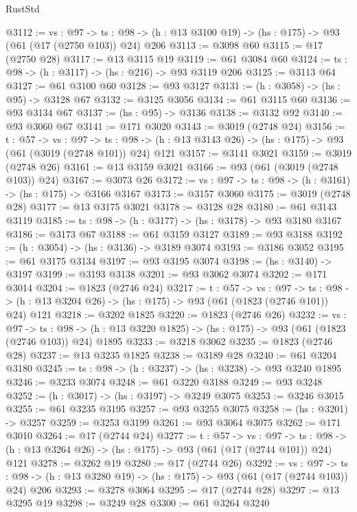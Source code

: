 \begin{lexlean}{RustStd}
\begin{coremodule}
@3112 := {vs : @97} ->
  {ts : @98} -> (h : @13 @3100 @19) -> (hs : @175) -> @93 (@61 (@17 (@2750 @103)) @24) @206
@3113 := @3098 @60
@3115 := @17 (@2750 @28)
@3117 := @13 @3115 @19
@3119 := @61 @3084 @60
@3124 := {ts : @98} -> (h : @3117) -> (hs : @216) -> @93 @3119 @206
@3125 := @3113 @64
@3127 := @61 @3100 @60
@3128 := @93 @3127
@3131 := (h : @3058) -> (hs : @95) -> @3128 @67
@3132 := @3125 @3056
@3134 := @61 @3115 @60
@3136 := @93 @3134 @67
@3137 := (hs : @95) -> @3136
@3138 := @3132 @92
@3140 := @93 @3060 @67
@3141 := @171 @3020
@3143 := @3019 (@2748 @24)
@3156 := {t : @57} ->
  {vs : @97} ->
  {ts : @98} -> (h : @13 @3143 @26) -> (hs : @175) -> @93 (@61 (@3019 (@2748 @101)) @24) @121
@3157 := @3141 @3021
@3159 := @3019 (@2748 @26)
@3161 := @13 @3159 @3021
@3166 := @93 (@61 (@3019 (@2748 @103)) @24)
@3167 := @3073 @26
@3172 := {vs : @97} -> {ts : @98} -> (h : @3161) -> (hs : @175) -> @3166 @3167
@3173 := @3157 @3060
@3175 := @3019 (@2748 @28)
@3177 := @13 @3175 @3021
@3178 := @3128 @28
@3180 := @61 @3143 @3119
@3185 := {ts : @98} -> (h : @3177) -> (hs : @3178) -> @93 @3180 @3167
@3186 := @3173 @67
@3188 := @61 @3159 @3127
@3189 := @93 @3188
@3192 := (h : @3054) -> (hs : @3136) -> @3189 @3074
@3193 := @3186 @3052
@3195 := @61 @3175 @3134
@3197 := @93 @3195 @3074
@3198 := (hs : @3140) -> @3197
@3199 := @3193 @3138
@3201 := @93 @3062 @3074
@3202 := @171 @3014
@3204 := @1823 (@2746 @24)
@3217 := {t : @57} ->
  {vs : @97} ->
  {ts : @98} -> (h : @13 @3204 @26) -> (hs : @175) -> @93 (@61 (@1823 (@2746 @101)) @24) @121
@3218 := @3202 @1825
@3220 := @1823 (@2746 @26)
@3232 := {vs : @97} ->
  {ts : @98} -> (h : @13 @3220 @1825) -> (hs : @175) -> @93 (@61 (@1823 (@2746 @103)) @24) @1895
@3233 := @3218 @3062
@3235 := @1823 (@2746 @28)
@3237 := @13 @3235 @1825
@3238 := @3189 @28
@3240 := @61 @3204 @3180
@3245 := {ts : @98} -> (h : @3237) -> (hs : @3238) -> @93 @3240 @1895
@3246 := @3233 @3074
@3248 := @61 @3220 @3188
@3249 := @93 @3248
@3252 := (h : @3017) -> (hs : @3197) -> @3249 @3075
@3253 := @3246 @3015
@3255 := @61 @3235 @3195
@3257 := @93 @3255 @3075
@3258 := (hs : @3201) -> @3257
@3259 := @3253 @3199
@3261 := @93 @3064 @3075
@3262 := @171 @3010
@3264 := @17 (@2744 @24)
@3277 := {t : @57} ->
  {vs : @97} ->
  {ts : @98} -> (h : @13 @3264 @26) -> (hs : @175) -> @93 (@61 (@17 (@2744 @101)) @24) @121
@3278 := @3262 @19
@3280 := @17 (@2744 @26)
@3292 := {vs : @97} ->
  {ts : @98} -> (h : @13 @3280 @19) -> (hs : @175) -> @93 (@61 (@17 (@2744 @103)) @24) @206
@3293 := @3278 @3064
@3295 := @17 (@2744 @28)
@3297 := @13 @3295 @19
@3298 := @3249 @28
@3300 := @61 @3264 @3240

\end{coremodule}
\end{lexlean}
